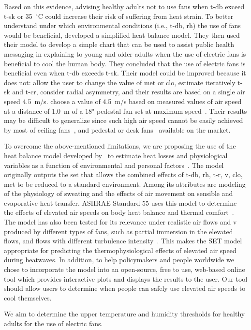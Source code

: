 Based on this evidence, advising healthy adults not to use fans when \ac{t-db} exceed \ac{t-sk} or 35~$^{\circ}$C could increase their risk of suffering from heat strain.
To better understand under which environmental conditions (i.e., \ac{t-db}, \ac{rh}) the use of fans would be beneficial,  developed a simplified heat balance model.
They then used their model to develop a simple chart that can be used to assist public health messaging in explaining to young and older adults when the use of electric fans is beneficial to cool the human body.
They concluded that the use of electric fans is beneficial even when \ac{t-db} exceeds \ac{t-sk}.
Their model could be improved because it does not: allow the user to change the value of \ac{met} or \ac{clo}, estimate iteratively \ac{t-sk} and \ac{t-cr}, consider radial asymmetry, and their results are based on a single air speed 4.5~m/s.
 choose a value of 4.5~m/s based on measured values of air speed at a distance of 1.0~m of a 18" pedestal fan set at maximum speed~\cite{Jay2015}.
Their results may be difficult to generalize since such high air speed cannot be easily achieved by most of ceiling fans~\cite{Raftery2019}, and pedestal or desk fans~\cite{Yang2015a} available on the market.

To overcome the above-mentioned limitations, we are proposing the use of the heat balance model developed by~ to estimate heat losses and physiological variables as a function of environmental and personal factors~\cite{Gagge1986}.
The model originally outputs the \ac{set} that allows the combined effects of \ac{t-db}, \ac{rh}, \ac{t-r}, \ac{v}, \ac{clo}, \ac{met} to be reduced to a standard environment.
Among its attributes are modeling of the physiology of sweating and the effects of air movement on sensible and evaporative heat transfer.
ASHRAE Standard 55 uses this model to determine the effects of elevated air speeds on body heat balance and thermal comfort~\cite{ashrae552017}.
The model has also been tested for its relevance under realistic air flows and \ac{v} produced by different types of fans, such as partial immersion in the elevated flows, and flows with different turbulence intensity~\cite{Huang2014}.
This makes the SET model appropriate for predicting the thermophysiological effects of elevated air speed during heatwaves.
In addition, to help policymakers and people worldwide we chose to incorporate the model into an open-source, free to use, web-based online tool which provides interactive plots and displays the results to the user.
Our tool should allow users to determine when people can safely use elevated air speeds to cool themselves.

We aim to determine the upper temperature and humidity thresholds for healthy adults for the use of electric fans.